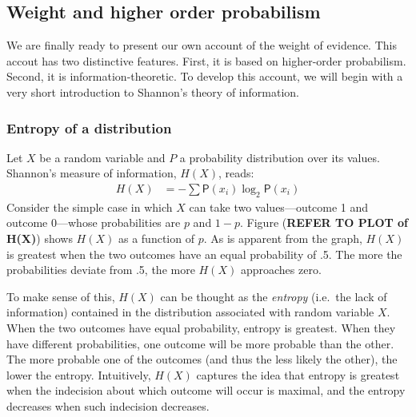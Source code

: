 \documentclass[
  10pt,
  dvipsnames,enabledeprecatedfontcommands]{scrartcl}
\begin{document}
\hypertarget{weight-and-higher-order-probabilism}{%
\subsection{Weight and higher order
probabilism}\label{weight-and-higher-order-probabilism}}

We are finally ready to present our own account of the weight of
evidence. This accout has two distinctive features. First, it is based
on higher-order probabilism. Second, it is information-theoretic. To
develop this account, we will begin with a very short introduction to
Shannon's theory of information.

\hypertarget{entropy-of-a-distribution}{%
\subsubsection{Entropy of a
distribution}\label{entropy-of-a-distribution}}


Let \(X\) be a random variable and \(P\) a probability distribution over
its values. Shannon's measure of information, \(H(X)\), reads:
\begin{align*}
H(X)  & =
- \sum \mathsf{P}(x_i) \log_2 \mathsf{P}(x_i)
\end{align*} \noindent  Consider the simple case in which \(X\) can take
two values---outcome 1 and outcome 0---whose probabilities are \(p\) and
\(1-p\). Figure (\textbf{REFER TO PLOT of H(X)}) shows
\(H(X)\) as a function of \(p\). As is apparent from the graph, \(H(X)\)
is greatest when the two outcomes have an equal probability of .5. The
more the probabilities deviate from .5, the more \(H(X)\) approaches
zero.

To make sense of this, \(H(X)\) can be thought as the \textit{entropy}
(i.e.~the lack of information) contained in the distribution associated
with random variable \(X\). When the two outcomes have equal
probability, entropy is greatest. When they have different
probabilities, one outcome will be more probable than the other. The
more probable one of the outcomes (and thus the less likely the other),
the lower the entropy. Intuitively, \(H(X)\) captures the idea that
entropy is greatest when the indecision about which outcome will occur
is maximal, and the entropy decreases when such indecision decreases.
\end{document}
